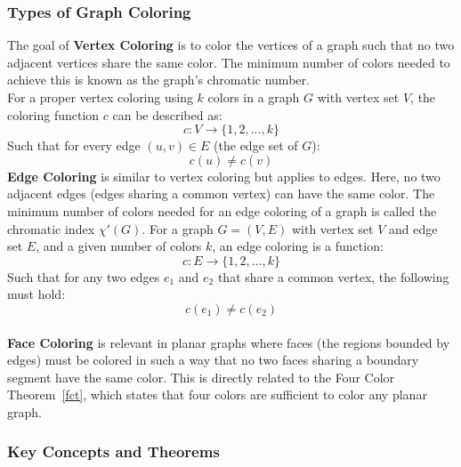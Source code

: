 \documentclass[12pt]{article}
\begin{document}
    \subsubsection{Types of Graph Coloring}\label{color}

    The goal of \textbf{Vertex Coloring} is to color the vertices of a graph such
    that no two adjacent vertices share the same color. The minimum number of colors
    needed to achieve this is known as the graph's chromatic number.\\
    For a proper vertex coloring using \( k \) colors in a graph \( G \) with
    vertex set \( V \), the coloring function \( c \) can be described as:
    \begin{equation}
        c: V \rightarrow \{1, 2, ..., k\}
    \end{equation}
    Such that for every edge \( (u, v) \in E \) (the edge set of \( G \)):
    \begin{equation}
        c(u) \neq c(v)
    \end{equation}
    \textbf{Edge Coloring} is similar to vertex coloring but applies to edges.
    Here, no two adjacent edges (edges sharing a common vertex) can have the same
    color. The minimum number of colors needed for an edge coloring of a graph is called the
    chromatic index \( \chi'(G) \). For a graph \( G = (V, E) \) with vertex
    set \( V \) and edge set \( E \), and a given number of colors \( k \), an edge
    coloring is a function:
    \begin{equation}
        c: E \rightarrow \{1, 2, \dots, k\}
    \end{equation}
    Such that for any two edges \( e_1 \) and \( e_2 \) that share a common vertex,
    the following must hold:
    \begin{equation}
        c(e_1) \neq c(e_2)
    \end{equation}
    \\
    \textbf{Face Coloring} is relevant in planar graphs where faces (the regions
    bounded by edges) must be colored in such a way that no two faces sharing a
    boundary segment have the same color. This is directly related to the
    Four Color Theorem~\ref{fct}, which states that four colors are sufficient to color
    any planar graph.

    \subsubsection{Key Concepts and Theorems}
\end{document}
